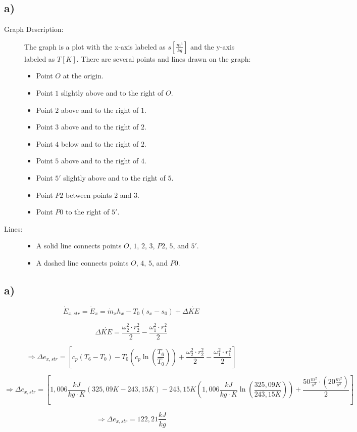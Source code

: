 

\subsection*{a)}

\begin{description}
    \item[Graph Description:] The graph is a plot with the x-axis labeled as $s\left[\frac{m^3}{kg}\right]$ and the y-axis labeled as $T\left[K\right]$. There are several points and lines drawn on the graph:
    \begin{itemize}
        \item Point $O$ at the origin.
        \item Point $1$ slightly above and to the right of $O$.
        \item Point $2$ above and to the right of $1$.
        \item Point $3$ above and to the right of $2$.
        \item Point $4$ below and to the right of $2$.
        \item Point $5$ above and to the right of $4$.
        \item Point $5'$ slightly above and to the right of $5$.
        \item Point $P2$ between points $2$ and $3$.
        \item Point $P0$ to the right of $5'$.
    \end{itemize}
    \item[Lines:] 
    \begin{itemize}
        \item A solid line connects points $O$, $1$, $2$, $3$, $P2$, $5$, and $5'$.
        \item A dashed line connects points $O$, $4$, $5$, and $P0$.
    \end{itemize}
\end{description}



\subsection*{a)}

\[
\dot{E}_{x,str} = \dot{E}_{x} = \dot{m}_{x} h_{x} - T_{0} (s_{x} - s_{0}) + \Delta \dot{KE}
\]

\[
\Delta \dot{KE} = \frac{\omega_{2}^2 \cdot r_{2}^2}{2} - \frac{\omega_{1}^2 \cdot r_{1}^2}{2}
\]

\[
\Rightarrow \Delta e_{x,str} = \left[ c_{p} (T_{6} - T_{0}) - T_{0} \left( c_{p} \ln \left( \frac{T_{6}}{T_{0}} \right) \right) + \frac{\omega_{2}^2 \cdot r_{2}^2}{2} - \frac{\omega_{1}^2 \cdot r_{1}^2}{2} \right]
\]

\[
\Rightarrow \Delta e_{x,str} = \left[ 1,006 \frac{kJ}{kg \cdot K} (325,09K - 243,15K) - 243,15K \left( 1,006 \frac{kJ}{kg \cdot K} \ln \left( \frac{325,09K}{243,15K} \right) \right) + \frac{50 \frac{m^2}{s^2} \cdot (20 \frac{m^2}{s^2})}{2} \right]
\]

\[
\Rightarrow \Delta e_{x,str} = 122,21 \frac{kJ}{kg}
\]